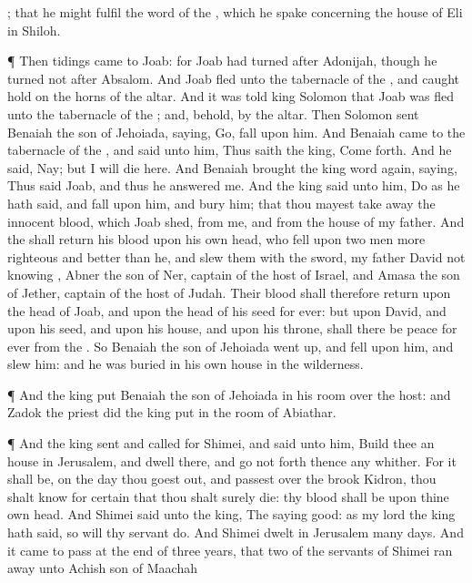 {{}; that he might
fulfil the
word of the
{}, which he
spake concerning the
house of
Eli in
Shiloh.
\par }{\PP {}¶ Then
tidings
came to
Joab: for
Joab had
turned
after
Adonijah, though he
turned not
after
Absalom. And
Joab
fled unto the
tabernacle of the
{}, and caught
hold on the
horns of the
altar.
And it was
told
king
Solomon that
Joab was
fled unto the
tabernacle of the
{}; and, behold,
{}
by the
altar. Then
Solomon
sent
Benaiah the
son of
Jehoiada,
saying,
Go,
fall upon him.
And
Benaiah
came to the
tabernacle of the
{}, and
said unto him, Thus
saith the
king, Come
forth. And he
said, Nay; but I will
die here. And
Benaiah
brought the
king
word
again,
saying, Thus
said
Joab, and thus he
answered me.
And the
king
said unto him,
Do as he hath
said, and
fall upon him, and
bury him; that thou mayest take
away the
innocent
blood, which
Joab
shed, from me, and from the
house of my
father.
And the
{} shall
return his
blood upon his own
head, who
fell upon
two
men more
righteous and
better than he, and
slew them with the
sword, my
father
David not
knowing
{},
Abner the
son of
Ner,
captain of the
host of
Israel, and
Amasa the
son of
Jether,
captain of the
host of
Judah.
Their
blood shall therefore
return upon the
head of
Joab, and upon the
head of his
seed for
ever: but upon
David, and upon his
seed, and upon his
house, and upon his
throne, shall there be
peace
for
ever from the
{}.
So
Benaiah the
son of
Jehoiada went
up, and
fell upon him, and
slew him: and he was
buried in his own
house in the
wilderness.
\par }{\PP {}¶ And the
king
put
Benaiah the
son of
Jehoiada in his room over the
host: and
Zadok the
priest did the
king
put in the room of
Abiathar.
\par }{\PP {}¶ And the
king
sent and
called for
Shimei, and
said unto him,
Build thee an
house in
Jerusalem, and
dwell there, and go not
forth thence any
whither.
For it shall be,
{} on the
day thou goest
out, and passest
over the
brook
Kidron, thou shalt
know for
certain that thou shalt
surely
die: thy
blood shall be upon thine own
head.
And
Shimei
said unto the
king, The
saying
{}
good: as my
lord the
king hath
said, so will thy
servant
do. And
Shimei
dwelt in
Jerusalem
many
days.
And it came to pass at the
end of
three
years, that
two of the
servants of
Shimei ran
away unto
Achish
son of
Maachah
}
